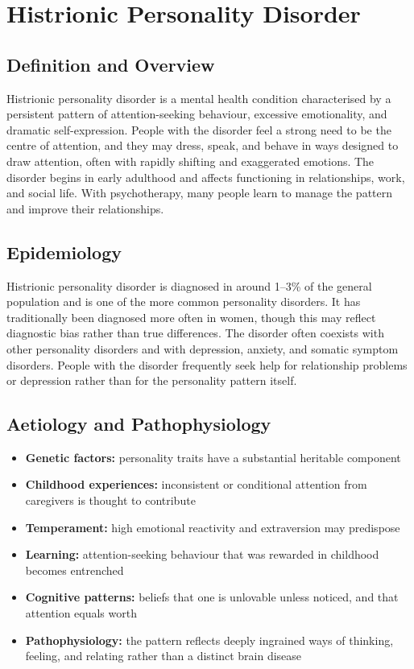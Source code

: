 \chapter{Histrionic Personality Disorder}

\section*{Definition and Overview}
Histrionic personality disorder is a mental health condition characterised by a persistent pattern of attention-seeking behaviour, excessive emotionality, and dramatic self-expression. People with the disorder feel a strong need to be the centre of attention, and they may dress, speak, and behave in ways designed to draw attention, often with rapidly shifting and exaggerated emotions. The disorder begins in early adulthood and affects functioning in relationships, work, and social life. With psychotherapy, many people learn to manage the pattern and improve their relationships.

\section*{Epidemiology}
Histrionic personality disorder is diagnosed in around 1--3\% of the general population and is one of the more common personality disorders. It has traditionally been diagnosed more often in women, though this may reflect diagnostic bias rather than true differences. The disorder often coexists with other personality disorders and with depression, anxiety, and somatic symptom disorders. People with the disorder frequently seek help for relationship problems or depression rather than for the personality pattern itself.

\section*{Aetiology and Pathophysiology}
\begin{itemize}
    \item \textbf{Genetic factors:} personality traits have a substantial heritable component
    \item \textbf{Childhood experiences:} inconsistent or conditional attention from caregivers is thought to contribute
    \item \textbf{Temperament:} high emotional reactivity and extraversion may predispose
    \item \textbf{Learning:} attention-seeking behaviour that was rewarded in childhood becomes entrenched
    \item \textbf{Cognitive patterns:} beliefs that one is unlovable unless noticed, and that attention equals worth
    \item \textbf{Pathophysiology:} the pattern reflects deeply ingrained ways of thinking, feeling, and relating rather than a distinct brain disease
\end{itemize}

